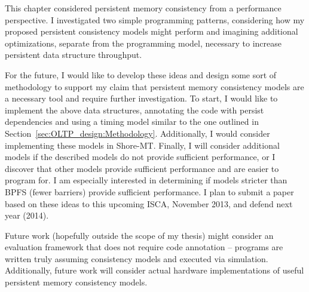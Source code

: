 This chapter considered persistent memory consistency from a performance perspective.
I investigated two simple programming patterns, considering how my proposed persistent consistency models might perform and imagining additional optimizations, separate from the programming model, necessary to increase persistent data structure throughput.

For the future, I would like to develop these ideas and design some sort of methodology to support my claim that persistent memory consistency models are a necessary tool and require further investigation.
To start, I would like to implement the above data structures, annotating the code with persist dependencies and using a timing model similar to the one outlined in Section~\ref{sec:OLTP_design:Methodology}.
Additionally, I would consider implementing these models in Shore-MT.
Finally, I will consider additional models if the described models do not provide sufficient performance, or I discover that other models provide sufficient performance and are easier to program for.
I am especially interested in determining if models stricter than BPFS (fewer barriers) provide sufficient performance.
I plan to submit a paper based on these ideas to this upcoming ISCA, November 2013, and defend next year (2014).

Future work (hopefully outside the scope of my thesis) might consider an evaluation framework that does not require code annotation -- programs are written truly assuming consistency models and executed via simulation.
Additionally, future work will consider actual hardware implementations of useful persistent memory consistency models.
